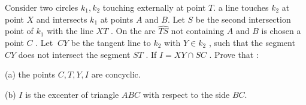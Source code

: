 Consider two circles $k_{1},k_{2}$ touching externally at point $T$. a line touches $k_{2}$ at point $X$ and intersects $k_{1}$ at points $A$ and $B$. Let $S$ be the second intersection point of $k_{1}$ with the line $XT$ . On the arc $\widehat{TS}$ not containing $A$ and $B$ is chosen a point $C$ . Let $\ CY$ be the tangent line to $k_{2}$ with $Y\in k_{2}$ , such that the segment $CY$ does not intersect the segment $ST$ . If $I=XY\cap SC$ . Prove that :

(a) the points $C,T,Y,I$ are concyclic.

(b) $I$ is the excenter of triangle $ABC$ with respect to the side $BC$.